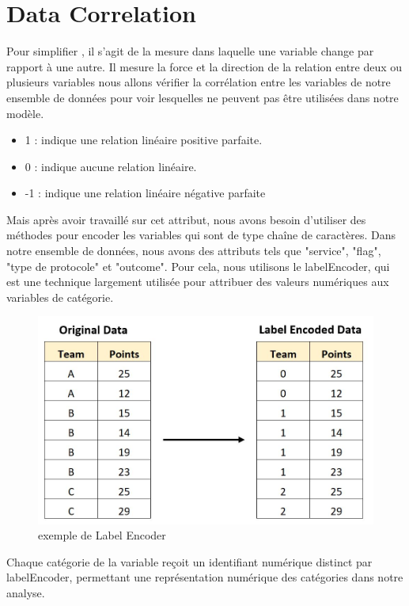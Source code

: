 \documentclass[a4paper,12pt]{report}
\begin{document}
\section {Data Correlation}
\noindent\normalsize Pour simplifier \cite{hair2019multivariate}, il s'agit de la mesure dans laquelle une variable change par rapport à une autre. Il mesure la force et la direction de la relation entre deux ou plusieurs variables
nous allons vérifier la corrélation entre les variables de notre ensemble de données pour voir lesquelles ne peuvent pas être utilisées dans notre modèle.
\begin{itemize}
    \item 1 : indique une relation linéaire positive parfaite.
    \item 0 : indique aucune relation linéaire.
    \item -1 : indique une relation linéaire négative parfaite
\end{itemize}
\noindent\normalsize Mais après avoir travaillé sur cet attribut, nous avons besoin d'utiliser des méthodes pour encoder les variables qui sont de type chaîne de caractères. Dans notre ensemble de données, nous avons des attributs tels que "service", "flag", "type de protocole" et "outcome". Pour cela, nous utilisons le labelEncoder, qui est une technique largement utilisée pour attribuer des valeurs numériques aux variables de catégorie. 
\begin{figure}[H]
\centering
 \includegraphics[scale=0.9]{outils-images/data6.jpg}
\caption{exemple de Label Encoder}
\end{figure}
\noindent\normalsize Chaque catégorie de la variable reçoit un identifiant numérique distinct par labelEncoder, permettant une représentation numérique des catégories dans notre analyse.
\end{document}
